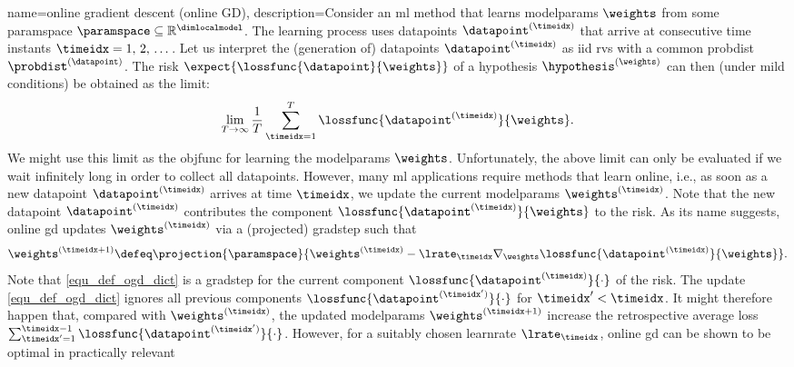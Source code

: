 {name={online gradient descent (online GD)}, 
	description={Consider  an \gls{ml} 
		method that learns \glspl{modelparam} $\weights$ from some 
		\gls{paramspace} $\paramspace \subseteq \mathbb{R}^{\dimlocalmodel}$. 
		The learning process uses \glspl{datapoint} $\datapoint^{(\timeidx)}$ 
		that arrive at consecutive time instants $\timeidx=1, \,2, \,\dots$. 
		Let us interpret the (generation of) \glspl{datapoint} $\datapoint^{(\timeidx)}$ 
		as \gls{iid} \glspl{rv} with a common \gls{probdist} $\probdist^{(\datapoint)}$. 
		The \gls{risk} $\expect\{ \lossfunc{\datapoint}{\weights} \}$ of a 
		\gls{hypothesis} $\hypothesis^{(\weights)}$ can then (under mild conditions) 
		be obtained as the limit:
		$$\lim_{T\rightarrow \infty} \frac{1}{T}\sum_{\timeidx=1}^{T} \lossfunc{\datapoint^{(\timeidx)}}{\weights}.$$ 
		We might use this limit as the \gls{objfunc} for learning the 
		\glspl{modelparam} $\weights$. Unfortunately, the above limit can 
		only be evaluated if we wait infinitely long in order to collect all \glspl{datapoint}. 
		However, many \gls{ml} applications require methods that learn online, i.e.,
		as soon as a new \gls{datapoint} $\datapoint^{(\timeidx)}$ arrives at 
		time $\timeidx$, we update the current \glspl{modelparam} $\weights^{(\timeidx)}$. 
		Note that the new \gls{datapoint} $\datapoint^{(\timeidx)}$ contributes 
		the component $\lossfunc{\datapoint^{(\timeidx)}}{\weights}$ to the \gls{risk}. 
		As its name suggests, online \gls{gd} updates $\weights^{(\timeidx)}$ via 
		a (projected) \gls{gradstep} such that
		\begin{equation} 
			\label{equ_def_ogd_dict}
 			\weights^{(\timeidx+1)} \defeq \projection{\paramspace}{\weights^{(\timeidx)} - \lrate_{\timeidx} \nabla_{\weights} \lossfunc{\datapoint^{(\timeidx)}}{\weights}}. 
		\end{equation} 
		Note that \eqref{equ_def_ogd_dict} is a \gls{gradstep} for the 
		current component $\lossfunc{\datapoint^{(\timeidx)}}{\cdot}$ 
		of the \gls{risk}. The update \eqref{equ_def_ogd_dict} ignores all 
		previous components $\lossfunc{\datapoint^{(\timeidx')}}{\cdot}$
		for $\timeidx' < \timeidx$. It might therefore happen that, compared 
		with $\weights^{(\timeidx)}$, the updated \glspl{modelparam} 
		$\weights^{(\timeidx+1)}$ increase the retrospective average 
		\gls{loss} $\sum_{\timeidx'=1}^{\timeidx-1} \lossfunc{\datapoint^{(\timeidx')}}{\cdot}$. 
		However, for a suitably chosen \gls{learnrate} $\lrate_{\timeidx}$, 
		online \gls{gd} can be shown to be optimal in practically relevant 
}}
